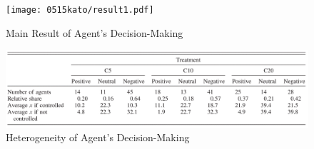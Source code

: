 \documentclass[../root]{subfiles}
\begin{document}
    \begin{figure}[h]
        \centering
        \texttt{[image: 0515kato/result1.pdf]}
        \caption{Main Result of Agent's Decision-Making}
        \label{result1}
    \end{figure}

    \begin{figure}[h]
        \centering
        \includegraphics[width = 16cm]{0515kato/result2.png}
        \caption{Heterogeneity of Agent's Decision-Making}
        \label{result2}
    \end{figure}
\end{document}
